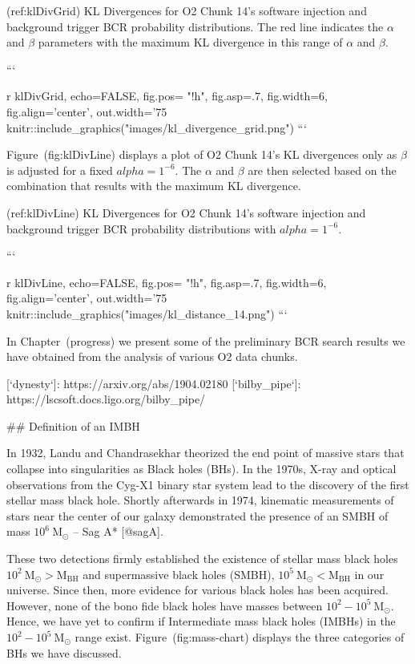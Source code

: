 {{{{{{{(ref:klDivGrid) KL Divergences for O2 Chunk 14's software injection and background trigger BCR probability distributions. The red line indicates the $\alpha$ and $\beta$ parameters with the maximum KL divergence in this range of $\alpha$ and $\beta$.

```{r klDivGrid, echo=FALSE, fig.pos= "!h", fig.asp=.7, fig.width=6, fig.align='center', out.width='75%
knitr::include_graphics("images/kl_divergence_grid.png")
```

Figure~\@ref(fig:klDivLine) displays a plot of O2 Chunk 14's KL divergences only as
$\beta$ is adjusted for a fixed $alpha=1^{-6}$. The $\alpha$ and $\beta$ are then selected
based on the combination that results with the maximum KL divergence.

(ref:klDivLine) KL Divergences for O2 Chunk 14's software injection and background trigger BCR probability distributions with $alpha=1^{-6}$.

```{r klDivLine, echo=FALSE, fig.pos= "!h", fig.asp=.7, fig.width=6, fig.align='center', out.width='75%
knitr::include_graphics("images/kl_distance_14.png")
```

In Chapter~\@ref(progress) we present some of the preliminary BCR search results we 
have obtained from the analysis of various O2 data chunks.  





[`dynesty`]: https://arxiv.org/abs/1904.02180
[`bilby_pipe`]: https://lscsoft.docs.ligo.org/bilby_pipe/


## Definition of an IMBH

In 1932, Landu and Chandrasekhar theorized the end point of massive
stars that collapse into singularities as Black holes (BHs). In the
1970s, X-ray and optical observations from the Cyg-X1 binary star system
lead to the discovery of the first stellar mass black hole. Shortly
afterwards in 1974, kinematic measurements of stars near the center of
our galaxy demonstrated the presence of an SMBH of mass
$10^6\ \text{M}_{\odot}$ -- Sag A* [@sagA].

These two detections firmly established the existence of stellar mass
black holes $10^{2} \ \text{M}_{\odot} > \text{M}_\text{BH}$ and
supermassive black holes (SMBH), $10^{5} \ \text{M}_{\odot} <
\text{M}_\text{BH}$ in our universe. Since then, more evidence for
various black holes has been acquired. However, none of the bono fide
black holes have masses between $10^{2} - 10^{5}\ \text{M}_{\odot}$. Hence,
we have yet to confirm if Intermediate mass black holes (IMBHs) in the
$10^{2} - 10^{5} \ \text{M}_{\odot}$ range exist.
Figure~\@ref(fig:mass-chart) displays the three categories of BHs
we have discussed.

}}}}}}}}}
